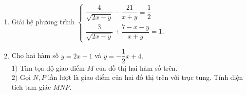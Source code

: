 \begin{ex}%
	\begin{enumerate}
	\item Giải hệ phương trình $\begin{cases} \dfrac{4}{\sqrt{2x-y}}-\dfrac{21}{x+y}=\dfrac{1}{2}\\ \dfrac{3}{\sqrt{2x-y}}+\dfrac{7-x-y}{x+y}=1. \end{cases}$
	\item Cho hai hàm số $y=2x-1$ và $y=-\dfrac{1}{2}x+4.$\\
	$1)$ Tìm tọa độ giao điểm $M$ của đồ thị hai hàm số trên.\\
	$2)$ Gọi $N, P$ lần lượt là giao điểm của hai đồ thị trên với trục tung. Tính diện tích tam giác $MNP.$
    \end{enumerate}


\end{ex}
